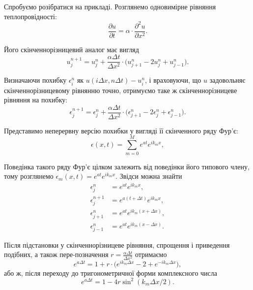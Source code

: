 Спробуємо розібратися на прикладі. Розглянемо одновимірне рівняння теплопровідності:
\begin{equation}
    \frac{\partial u}{\partial t} = \alpha \cdot \frac{\partial^2 u}{\partial x^2}.
\end{equation}

Його скінченнорізницевий аналог має вигляд
\begin{equation}
    u_j^{n + 1} = u_j^n + \frac{\alpha \Delta t}{\Delta x^2} \cdot \Big( u_{j + 1}^n - 2 u_j^n + u_{j - 1}^n \Big).
\end{equation}

Визначаючи похибку $\epsilon_i^n$ як $u(i \Delta x, n \Delta t) - u_i^n$, і враховуючи, що $u$ задовольняє скінченнорізницевому рівнянню точно, отримуємо таке ж скінченнорізницеве рівняння на похибку:
\begin{equation}
    \epsilon_j^{n + 1} = \epsilon_j^n + \frac{\alpha \Delta t}{\Delta x^2} \cdot \Big( \epsilon_{j + 1}^n - 2 \epsilon_j^n + \epsilon_{j - 1}^n \Big).
\end{equation}

Представимо неперервну версію похибки у вигляді її скінченного ряду Фур'є:
\begin{equation}
    \epsilon(x, t) = \sum_{m = 0}^M e^{a t} e^{i k_m x},
\end{equation}

Поведінка такого ряду Фур'є цілком залежить від поведінки його типового члену, тому розглянемо  $\epsilon_m(x, t) = e^{a t} e^{i k_m x}$. Звідси можна знайти
\begin{align}
    \epsilon_j^n &= e^{a t} e^{i k_m x}, \\
    \epsilon_j^{n + 1} &= e^{a (t + \Delta t)} e^{i k_m x}, \\
    \epsilon_{j + 1}^n &= e^{a t} e^{i k_m (x + \Delta x)}, \\
    \epsilon_{j - 1}^n &= e^{a t} e^{i k_m (x - \Delta x)}.
\end{align}

Після підстановки у скінченнорізницеве рівняння, спрощення і приведення подібних, а також пере-позначення $r = \frac{\alpha \Delta t}{\Delta x^2}$ отримаємо
\begin{equation}
    e^{a \Delta t} = 1 + r \cdot \Big( e^{i k_m \Delta x} - 2 + e^{-i k_m \Delta x} \Big),
\end{equation}
або ж, після переходу до тригонометричної  форми комплексного числа
\begin{equation}
    e^{a \Delta t} = 1 - 4 r \sin^2(k_m \Delta x / 2).
\end{equation}

